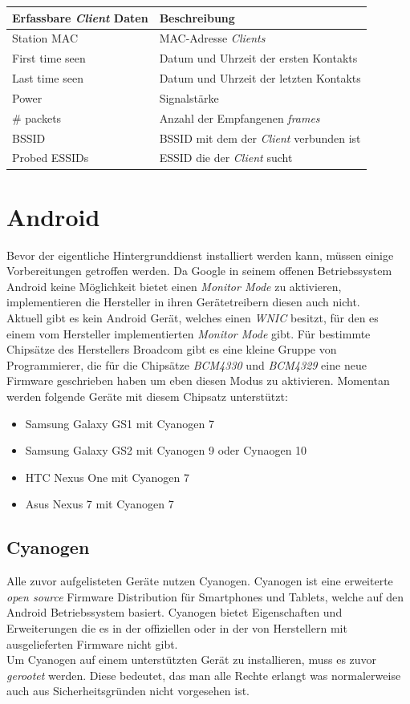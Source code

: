 \documentclass[]{report}
\begin{document}
\begin{center}
  \begin{tabulary}{\textwidth}{l | L}
\toprule
Erfassbare \textit{Client} Daten & Beschreibung \\
\midrule
Station MAC & MAC-Adresse \textit{Clients} \\
First time seen & Datum und Uhrzeit der ersten Kontakts \\
Last time seen & Datum und Uhrzeit der letzten Kontakts \\
Power & Signalstärke \\
\# packets & Anzahl der Empfangenen \textit{frames} \\
BSSID & BSSID mit dem der \textit{Client} verbunden ist \\
Probed ESSIDs & ESSID die der \textit{Client} sucht \\
\bottomrule
\end{tabulary}
\end{center}
\section{Android}
Bevor der eigentliche Hintergrunddienst installiert werden kann, müssen einige Vorbereitungen getroffen werden. Da Google in seinem offenen Betriebssystem Android keine Möglichkeit bietet einen \textit{Monitor Mode} zu aktivieren, implementieren die Hersteller in ihren Gerätetreibern diesen auch nicht.\\
Aktuell gibt es kein Android Gerät, welches einen \textit{WNIC} besitzt, für den es einem vom Hersteller implementierten \textit{Monitor Mode} gibt. Für bestimmte Chipsätze des Herstellers Broadcom\cite{Broadcom} gibt es eine kleine Gruppe von Programmierer, die für die Chipsätze \textit{BCM4330}\cite{BCM4330} und \textit{BCM4329}\cite{BCM4329} eine neue Firmware geschrieben haben um eben diesen Modus zu aktivieren. Momentan werden folgende Geräte mit diesem Chipsatz unterstützt\cite{bcmonBlog}:
\begin{itemize}
\item Samsung Galaxy GS1 mit Cyanogen 7
\item Samsung Galaxy GS2 mit Cyanogen 9 oder Cynaogen 10
\item HTC Nexus One mit Cyanogen 7
\item Asus Nexus 7 mit Cyanogen 7
\end{itemize}
\subsection{Cyanogen}
Alle zuvor aufgelisteten Geräte nutzen Cyanogen\cite{Cyanogen}. Cyanogen ist eine erweiterte \textit{open source} Firmware Distribution für Smartphones und Tablets, welche auf den Android Betriebssystem basiert. Cyanogen bietet Eigenschaften und Erweiterungen die es in der offiziellen oder in der von Herstellern mit ausgelieferten Firmware nicht gibt. \\
Um Cyanogen auf einem unterstützten Gerät zu installieren, muss es zuvor \textit{gerootet} werden. Diese bedeutet, das man alle Rechte erlangt was normalerweise auch aus Sicherheitsgründen nicht vorgesehen ist. 
\end{document}
